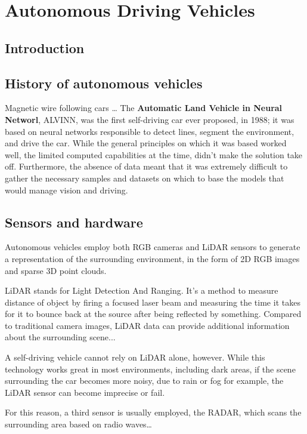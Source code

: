\newpage
\section{Autonomous Driving Vehicles}
\subsection{Introduction}




\subsection{History of autonomous vehicles}
Magnetic wire following cars \dots
The \textbf{Automatic Land Vehicle in Neural Networl}, ALVINN, was the first self-driving car ever proposed, in 1988; it was based on neural networks responsible to detect lines, segment the environment, and drive the car.
While the general principles on which it was based worked well, the limited computed capabilities at the time, didn't make the solution take off. Furthermore, the absence of data meant that it was extremely difficult to gather the necessary samples and datasets on which to base the models that would manage vision and driving.


\subsection{Sensors and hardware}
Autonomous vehicles employ both RGB cameras and LiDAR sensors to generate a representation of the surrounding environment, in the form of 2D RGB images and sparse 3D point clouds.



LiDAR stands for Light Detection And Ranging. It's a method to measure distance of object by firing a focused laser beam and measuring the time it takes for it to bounce back at the source after being reflected by something.
Compared to traditional camera images, LiDAR data can provide additional information about the surrounding scene...

A self-driving vehicle cannot rely on LiDAR alone, however. While this technology works great in most environments, including dark areas, if the scene surrounding the car becomes more noisy, due to rain or fog for example, the LiDAR sensor can become imprecise or fail.

For this reason, a third sensor is usually employed, the RADAR, which scans the surrounding area based on radio waves\dots





